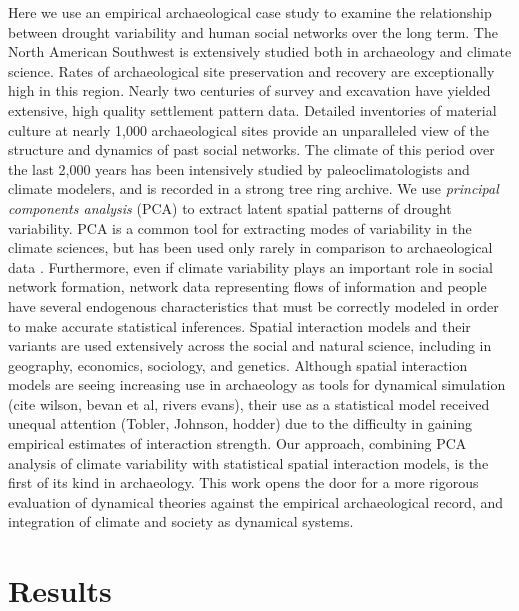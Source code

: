 \documentclass[fleqn,10pt]{wlscirep}
\begin{document}
Here we use an empirical archaeological case study to examine the relationship between drought variability and human social networks over the long term. The North American Southwest is extensively studied both in archaeology and climate science. Rates of archaeological site preservation and recovery are exceptionally high in this region. Nearly two centuries of survey and excavation have yielded extensive, high quality settlement pattern data. Detailed inventories of material culture at nearly 1,000 archaeological sites provide an unparalleled view of the structure and dynamics of past social networks. The climate of this period over the last 2,000 years has been intensively studied by paleoclimatologists and climate modelers, and is recorded in a strong tree ring archive. We use \textit{principal components analysis} (PCA) to extract latent spatial patterns of drought variability. PCA is a common tool for extracting modes of variability in the climate sciences, but has been used only rarely in comparison to archaeological data \cite{Weiss1982,vanwest}. Furthermore, even if climate variability plays an important role in social network formation, network data representing flows of information and people have several endogenous characteristics that must be correctly modeled in order to make accurate statistical inferences. Spatial interaction models and their variants are used extensively across the social and natural science, including in geography, economics, sociology, and genetics. Although spatial interaction models are seeing increasing use in archaeology as tools for dynamical simulation (cite wilson, bevan et al, rivers evans), their use as a statistical model received unequal attention (Tobler, Johnson, hodder) due to the difficulty in gaining empirical estimates of interaction strength. Our approach, combining PCA analysis of climate variability with statistical spatial interaction models, is the first of its kind in archaeology. This work opens the door for a more rigorous evaluation of dynamical theories against the empirical archaeological record, and integration of climate and society as dynamical systems.


\section*{Results}
\end{document}
